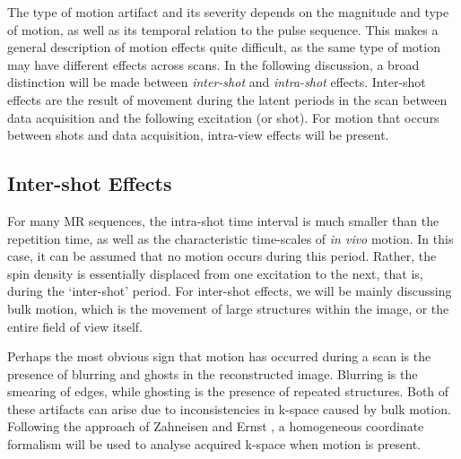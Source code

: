 \documentclass[class=article, crop=false]{standalone}
\begin{document}
The type of motion artifact and its severity depends on the magnitude and type of motion, as well as its temporal relation to the pulse sequence. This makes a general description of motion effects quite difficult, as the same type of motion may have different effects across scans. In the following discussion, a broad distinction will be made between \textit{inter-shot} and \textit{intra-shot} effects. Inter-shot effects are the result of movement during the latent periods in the scan between data acquisition and the following excitation (or shot). For motion that occurs between shots and data acquisition, intra-view effects will be present.

\subsection{Inter-shot Effects}

For many MR sequences, the intra-shot time interval is much smaller than the repetition time, as well as the characteristic time-scales of \textit{in vivo} motion. In this case, it can be assumed that no motion occurs during this period. Rather, the spin density is essentially displaced from one excitation to the next, that is, during the `inter-shot' period. For inter-shot effects, we will be mainly discussing bulk motion, which is the movement of large structures within the image, or the entire field of view itself. 
\par
Perhaps the most obvious sign that motion has occurred during a scan is the presence of blurring and ghosts in the reconstructed image. Blurring is the smearing of edges, while ghosting is the presence of repeated structures. Both of these artifacts can arise due to inconsistencies in k-space caused by bulk motion. Following the approach of Zahneisen and Ernst \parencite*{Zahneisen2016}, a homogeneous coordinate formalism will be used to analyse acquired k-space when motion is present.
\end{document}
